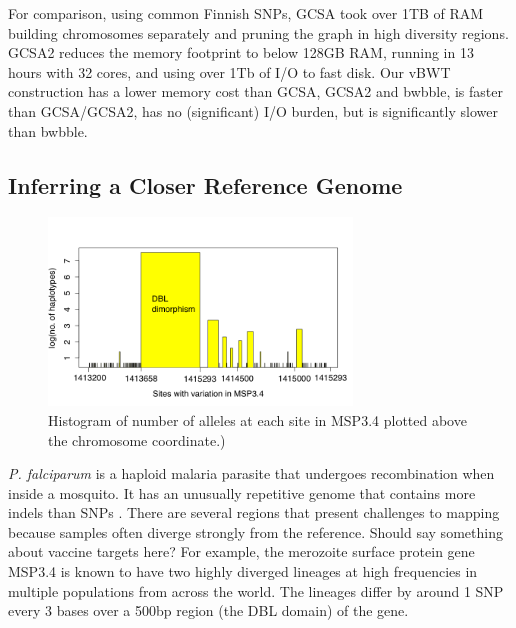 \documentclass[runningheads,a4paper]{llncs}
\begin{document}
For comparison, using common Finnish SNPs, GCSA took over 1TB of RAM building chromosomes separately and pruning the graph in high diversity regions. GCSA2 reduces the memory footprint to below 128GB RAM, running in 13 hours with 32 cores, and using  over 1Tb of I/O to fast  disk.  Our vBWT construction has a lower  memory cost than GCSA, GCSA2 and bwbble,  is faster than GCSA/GCSA2, has no (significant) I/O burden, but is significantly slower than bwbble. 



\subsection{Inferring a Closer Reference Genome}

\begin{figure}
\centering
\includegraphics[height=5cm]{PRG.png}
\caption{Histogram of number of alleles at each site in MSP3.4 plotted above the chromosome coordinate.)}
\label{fig:example}
\end{figure}

\textit{P. falciparum} is a haploid malaria parasite that undergoes recombination when inside a mosquito. It has an unusually repetitive genome that contains more indels than SNPs \cite{miles}. There are several regions that present challenges to mapping because samples often diverge strongly from the reference. Should say something about vaccine targets here? For example, the merozoite surface protein gene MSP3.4 is known to have two highly diverged lineages at high frequencies in multiple populations from across the world.  The lineages differ by around 1 SNP every 3 bases over a 500bp region (the DBL domain) of the gene.
\end{document}

